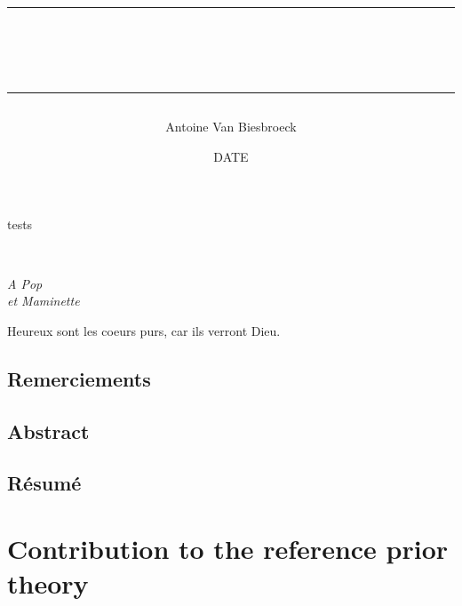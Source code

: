 \documentclass[a4paper]{book}
\title{\hrule\vspace*{0.5em}
    \textbf{\PhDTitle}
    \vspace*{0.5em}\\ \hrule
    }
\author{Antoine Van Biesbroeck}
\date{DATE}
\renewcommand{\familydefault}{\sfdefault}
\begin{document}
\pagestyle{empty}

tests

\newpage 
\normalsize
\renewcommand{\familydefault}{\rmdefault}
\normalfont


\maketitle

\ 
\vfill
\begin{FlushRight}\itshape
A Pop\\
et Maminette
\end{FlushRight}
\vfill
Heureux sont les coeurs purs, car ils verront Dieu.

\newpage
\pagestyle{plain}

\chapter*{Remerciements}


\newpage

\chapter*{Abstract}



\abstractEN



\chapter*{Résumé}


\abstractFR


\dominitoc
\setcounter{tocdepth}{1}
\tableofcontents
\newpage

\pagestyle{fancy}\thispagestyle{plain}





\part{Contribution to the reference prior theory}\label{part:ref-theory}
\end{document}
